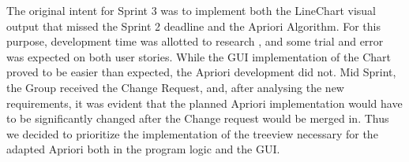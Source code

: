 The original intent for Sprint 3 was to implement both the LineChart visual output that missed the Sprint 2 deadline and the Apriori Algorithm. For this purpose, development time was allotted to research , and some trial and error was expected on both user stories. 
While the GUI implementation of the Chart proved to be easier than expected, the Apriori development did not. Mid Sprint, the Group received the Change Request, and, after analysing the new requirements, it was evident that the planned Apriori implementation would have to be significantly changed after the Change request would be merged in. 
Thus we decided to prioritize the implementation of the treeview necessary for the adapted Apriori both in the program logic and the GUI. 
